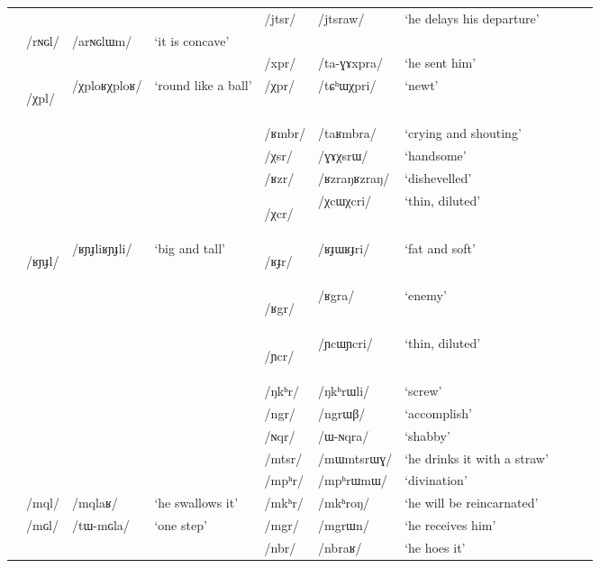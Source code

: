 \documentclass[12pt]{article}
\newcommand{\ipa}[1]{\mbox{\phon/#1/}}
\newcommand{\trois}[1]{\ipa{#1}\addtocounter{3clusters}{1}}
\newcommand{\tib}[1]{\cellcolor{lightgray}\textbf{#1}}
\newcommand{\idph}[1]{\cellcolor{gray}\textbf{#1}}
\newcommand{\resetcounters}[2]{
\newcounter{#1}
\newcounter{#2}
 \setcounter{#1}{\value{2clusters}}
  \setcounter{#2}{\value{3clusters}}
 \setcounter{2clusters}{0}
  \setcounter{3clusters}{0}
}
\begin{document}
\begin{landscape}
\begin{longtable}{llllllllll}
 & & & &\trois{jtsr} & \ipa{jtsraw} & `he delays his departure' \\ 
 & \trois{rɴɢl} & \ipa{arɴɢlɯm} & `it is concave' & & &\\ 
 & & & & \trois{xpr} & \ipa{ta-ɣɤxpra} & `he sent him' \\ 
 &\trois{χpl} \idph{} &\ipa{χploʁχploʁ} & `round like a ball' &\trois{χpr} & \ipa{tɕʰɯχpri} & `newt' \\ 
 & & & &\trois{ʁmbr} & \ipa{taʁmbra} & `crying and shouting' \\ 
 & & & &\trois{χsr} & \ipa{ɣɤχsrɯ} & `handsome' \\ 
 & & & &\trois{ʁzr} & \ipa{ʁzraŋʁzraŋ} & `dishevelled' \\ 
 & & & &\trois{χcr} \idph{} & \ipa{χcɯχcri} & `thin, diluted' \\ 
 &\trois{ʁɲɟl}  \idph{} & \ipa{ʁɲɟliʁɲɟli} & `big and tall' &\trois{ʁɟr}  \idph{} & \ipa{ʁɟɯʁɟri} & `fat and soft' \\ 
 & & & &\trois{ʁgr} \tib{} & \ipa{ʁgra} & `enemy' \\ 
 & & & &\trois{ɲcr} \idph{} & \ipa{ɲcɯɲcri} & `thin, diluted' \\ 
 & & & &\trois{ŋkʰr} & \ipa{ŋkʰrɯli} & `screw' \\ 
 & & & &\trois{ngr} & \ipa{ngrɯβ} & `accomplish' \\
 & & & &\trois{ɴqr} & \ipa{ɯ-ɴqra} & `shabby' \\     
 & & & &\trois{mtsr} & \ipa{mɯmtsrɯɣ} & `he drinks it with a straw' \\ 
 & & & &\trois{mpʰr} & \ipa{mpʰrɯmɯ} & `divination' \\ 
 &\trois{mql} & \ipa{mqlaʁ} & `he swallows it' &\trois{mkʰr} & \ipa{mkʰroŋ} & `he will be reincarnated' \\ 
 &\trois{mɢl} & \ipa{tɯ-mɢla} & `one step' &\trois{mgr} & \ipa{mgrɯn} & `he receives him' \\ 
 & & & &\trois{nbr} & \ipa{nbraʁ} & `he hoes it' \\ 
 \bottomrule
\end{longtable} 
\end{landscape} 
\resetcounters{2Clr}{3Clr} %
  
\end{document}
